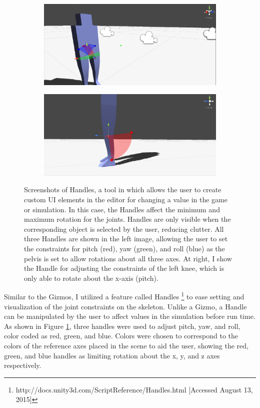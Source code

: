 \begin{figure}[ht]
	\centering
	\begin{subfigure}[b]{0.49\textwidth}
		\includegraphics[width=\textwidth]{images/handles1.png}
	\end{subfigure}
	\begin{subfigure}[b]{0.49\textwidth}
		\includegraphics[width=\textwidth]{images/handles2.png}
	\end{subfigure}
	\caption[Screenshot of Handles used for setting and visualizing joint constraints in \unity{}]{Screenshots of Handles, a tool in \unity{} which allows the user to create custom UI elements in the editor for changing a value in the game or simulation.  In this case, the Handles affect the minimum and maximum rotation for the joints.  Handles are only visible when the corresponding object is selected by the user, reducing clutter.  All three Handles are shown in the left image, allowing the user to set the constraints for pitch (red), yaw (green), and roll (blue) as the pelvis is set to allow rotations about all three axes.  At right, I show the Handle for adjusting the constraints of the left knee, which is only able to rotate about the x-axis (pitch).}
	\label{fig:handle_vis}
\end{figure}

Similar to the Gizmos, I utilized a feature called Handles \footnote{http://docs.unity3d.com/ScriptReference/Handles.html [Accessed August 13, 2015]} to ease setting and visualization of the joint constraints on the skeleton.  Unlike a Gizmo, a Handle can be manipulated by the user to affect values in the simulation before run time.  As shown in Figure \ref{fig:handle_vis}, three handles were used to adjust pitch, yaw, and roll, color coded as red, green, and blue.  Colors were chosen to correspond to the colors of the reference axes placed in the scene to aid the user, showing the red, green, and blue handles as limiting rotation about the x, y, and z axes respectively.

